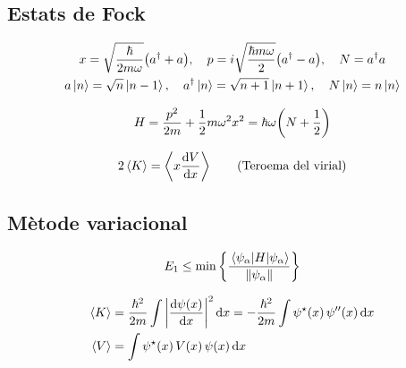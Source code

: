 \setcounter{section}{3}

\section{\mytitle}
\subsection{Estats de Fock}
\begin{align*}
\begin{gathered}
	x = \sqrt{\frac{\hbar}{2m\omega}} \qty(a\sdag + a) \qc p = i \sqrt{\frac{\hbar m \omega}{2}} \qty(a\sdag - a) \qc N = a\sdag a \\
	a \ket{n} = \sqrt{n} \ket{n-1} \qc a\sdag \ket{n} = \sqrt{n+1}\ket{n+1} \qc N \ket{n} = n \ket{n} \\
\end{gathered}
\end{align*}

\begin{align*}
	H = \frac{p^{2}}{2m} + \frac{1}{2} m \omega^{2} x^{2} = \hbar \omega \qty(N + \frac{1}{2})
\end{align*}

\begin{align*}
	2 \ev{K} = \ev{x \dv{V}{x}} \tag{Teroema del virial}
\end{align*}

\subsection{Mètode variacional}
\begin{align*}
	E_{1} \leq \min \qty{\frac{\ev{H}{\psi_{\alpha}}} {\norm{\psi_{\alpha}}}}
\end{align*}

\begin{align*}
\begin{aligned}
	\ev{K} &= \frac{\hbar^{2}}{2m} \int \abs{\dv{\psi(x)}{x}}^{2} \dd{x} = - \frac{\hbar^{2}}{2m} \int \psi\sast(x) \, \psi''(x) \dd{x} \\
	\ev{V} &= \int \psi\sast(x) \, V(x) \, \psi(x) \dd{x}
\end{aligned}
\end{align*}

